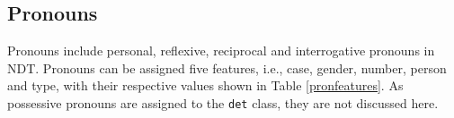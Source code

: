 \documentclass[a4paper,12pt,english]{book}
\begin{document}

\subsection{Pronouns}
Pronouns include personal, reflexive, reciprocal and interrogative pronouns in
NDT. Pronouns can be assigned five features, i.e., case, gender, number, person
and type, with their respective values shown in Table \ref{pronfeatures}. As
possessive pronouns are assigned to the \texttt{det} class, they are not
discussed here.
\end{document}
